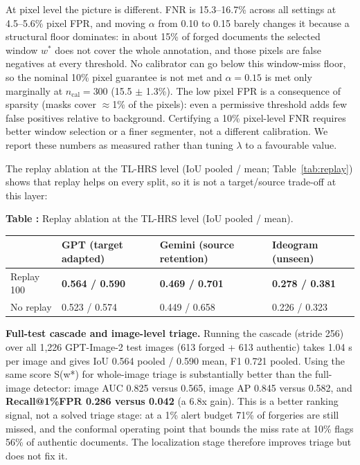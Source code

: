 \documentclass[preprint,12pt]{elsarticle}
\newcounter{tabno}
\newcommand{\tabcaption}[1]{\par\needspace{9\baselineskip}\refstepcounter{tabno}\noindent\textbf{Table \thetabno:} #1\par\vspace{2pt}}
\begin{document}
At pixel level the picture is different. FNR is 15.3--16.7\% across all settings at 4.5--5.6\% pixel FPR, and moving $\alpha$ from 0.10 to 0.15 barely changes it because a structural floor dominates: in about 15\% of forged documents the selected window $w^*$ does not cover the whole annotation, and those pixels are false negatives at every threshold. No calibrator can go below this window-miss floor, so the nominal 10\% pixel guarantee is not met and $\alpha=0.15$ is met only marginally at $n_{\mathrm{cal}}=300$ (15.5 $\pm$ 1.3\%). The low pixel FPR is a consequence of sparsity (masks cover $\approx$1\% of the pixels): even a permissive threshold adds few false positives relative to background. Certifying a 10\% pixel-level FNR requires better window selection or a finer segmenter, not a different calibration. We report these numbers as measured rather than tuning $\lambda$ to a favourable value.

The replay ablation at the TL-HRS level (IoU pooled / mean; Table~\ref{tab:replay}) shows that replay helps on every split, so it is not a target/source trade-off at this layer:

{
\tabcaption{Replay ablation at the TL-HRS level (IoU pooled / mean).}\label{tab:replay}
\begin{longtable}[]{@{}llll@{}}
\toprule\noalign{}

 & 
GPT (target adapted)
 & 
Gemini (source retention)
 & 
Ideogram (unseen)
 \\
\midrule\noalign{}
\endhead
\bottomrule\noalign{}
\endlastfoot
Replay 100 & \textbf{0.564 / 0.590} & \textbf{0.469 / 0.701} & \textbf{0.278 / 0.381} \\
No replay & 0.523 / 0.574 & 0.449 / 0.658 & 0.226 / 0.323 \\
\end{longtable}
}

\textbf{Full-test cascade and image-level triage.} Running the cascade (stride 256) over all 1,226 GPT-Image-2 test images (613 forged + 613 authentic) takes 1.04 s per image and gives IoU 0.564 pooled / 0.590 mean, F1 0.721 pooled. Using the same score S(w*) for whole-image triage is substantially better than the full-image detector: image AUC 0.825 versus 0.565, image AP 0.845 versus 0.582, and \textbf{Recall@1\%FPR 0.286 versus 0.042} (a 6.8x gain). This is a better ranking signal, not a solved triage stage: at a 1\% alert budget 71\% of forgeries are still missed, and the conformal operating point that bounds the miss rate at 10\% flags 56\% of authentic documents. The localization stage therefore improves triage but does not fix it.
\end{document}
